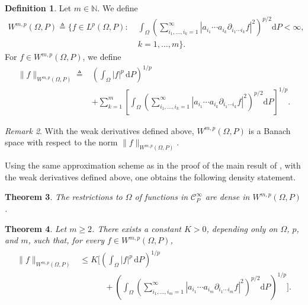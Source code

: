 \documentclass[12pt]{article}
\theoremstyle{plain}
\newtheorem{theorem}{Theorem}[section]
\theoremstyle{definition}
\newtheorem{definition}[theorem]{Definition}
\theoremstyle{remark}
\newtheorem{remark}[theorem]{Remark}
\numberwithin{equation}{section}
\newcommand{\nn}{\mathbb{N}}
\begin{document}

\begin{definition}
Let $m\in\nn$. We define
\[
\begin{aligned}
W^{m,p}(\Omega,P)\triangleq\Bigg\{f\in L^p(\Omega,P):\;&
\int_{\Omega}
\left(
\sum_{i_1,\ldots,i_k=1}^{\infty}
\left|a_{i_1}\cdots a_{i_k}\partial_{i_1\cdots i_k}f\right|^2
\right)^{p/2}\mathrm dP<\infty,\\[-1mm]
&k=1,\ldots,m\Bigg\}.
\end{aligned}
\]
For $f\in W^{m,p}(\Omega,P)$, we define
\[
\begin{aligned}
\|f\|_{W^{m,p}(\Omega,P)}
\triangleq {}&
\left(\int_{\Omega}|f|^p\,\mathrm dP\right)^{1/p}\\
&+\sum_{k=1}^{m}
\left[
\int_{\Omega}
\left(
\sum_{i_1,\ldots,i_k=1}^{\infty}
\left|a_{i_1}\cdots a_{i_k}\partial_{i_1\cdots i_k}f\right|^2
\right)^{p/2}\mathrm dP
\right]^{1/p}.
\end{aligned}
\]
\end{definition}
\begin{remark}
		With the weak derivatives defined above, $W^{m,p}(\Omega,P)$ is a Banach space with respect to the norm $\|f\|_{W^{m,p}(\Omega,P)}$.
\end{remark}
Using the same approximation scheme as in the proof of the main result of \cite{WYZZ}, with the weak derivatives defined above, one obtains the following density statement.
\begin{theorem}\label{choumixingdingli}
The restrictions to $\Omega$ of functions in $\mathscr C_P^\infty$ are dense in $W^{m,p}(\Omega,P)$.
	\end{theorem}
\begin{theorem}\label{1ff1f3}
Let $m\geqslant2$.  There exists a constant $K>0$, depending only on $\Omega$, $p$, and $m$, such that, for every $f\in W^{m,p}\left( \Omega ,P\right)$,
\begin{eqnarray}
\begin{aligned}
\|f\|_{W^{m,p}(\Omega,P)}
&\leqslant K\Bigg[
\left(\int_{\Omega}|f|^p\,\mathrm dP\right)^{1/p}\\
&\qquad\quad+
\left(
\int_{\Omega}
\left(
\sum_{i_1,\ldots,i_m=1}^{\infty}
\left|a_{i_1}\cdots a_{i_m}\partial_{i_1\cdots i_m}f\right|^2
\right)^{p/2}\mathrm dP
\right)^{1/p}
\Bigg].
\end{aligned}
\label{13f113vgv3v13v}
\end{eqnarray}
\end{theorem}
\end{document}
